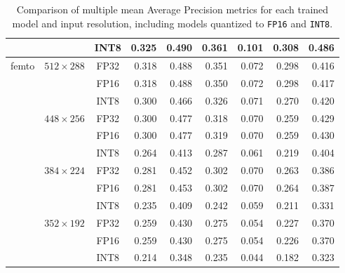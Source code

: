 \begin{appendices}
\begin{table}[t]
\begin{tabular}{|c|c|c|rrrrrr|}
                                    &                                  & INT8 & 0.325 & 0.490 & 0.361 & 0.101 & 0.308 & 0.486 \\
        \hline
        \multirow{12}{*}{femto}     & \multirow{3}{*}{$512\times288$}  & FP32 & 0.318 & 0.488 & 0.351 & 0.072 & 0.298 & 0.416 \\
                                    &                                  & FP16 & 0.318 & 0.488 & 0.350 & 0.072 & 0.298 & 0.417 \\
                                    &                                  & INT8 & 0.300 & 0.466 & 0.326 & 0.071 & 0.270 & 0.420 \\
        \cline{2-9}
                                    & \multirow{3}{*}{$448\times256$}  & FP32 & 0.300 & 0.477 & 0.318 & 0.070 & 0.259 & 0.429 \\
                                    &                                  & FP16 & 0.300 & 0.477 & 0.319 & 0.070 & 0.259 & 0.430 \\
                                    &                                  & INT8 & 0.264 & 0.413 & 0.287 & 0.061 & 0.219 & 0.404 \\
        \cline{2-9}
                                    & \multirow{3}{*}{$384\times224$}  & FP32 & 0.281 & 0.452 & 0.302 & 0.070 & 0.263 & 0.386 \\
                                    &                                  & FP16 & 0.281 & 0.453 & 0.302 & 0.070 & 0.264 & 0.387 \\
                                    &                                  & INT8 & 0.235 & 0.409 & 0.242 & 0.059 & 0.211 & 0.331 \\
        \cline{2-9}
                                    & \multirow{3}{*}{$352\times192$}  & FP32 & 0.259 & 0.430 & 0.275 & 0.054 & 0.227 & 0.370 \\
                                    &                                  & FP16 & 0.259 & 0.430 & 0.275 & 0.054 & 0.226 & 0.370 \\
                                    &                                  & INT8 & 0.214 & 0.348 & 0.235 & 0.044 & 0.182 & 0.323 \\
        \hline
    \end{tabular}
    \normalsize
    \caption{Comparison of multiple mean Average Precision metrics for each
    trained model and input resolution, including models quantized to
    \texttt{FP16} and \texttt{INT8}.}
\end{table}







\end{appendices}

% 